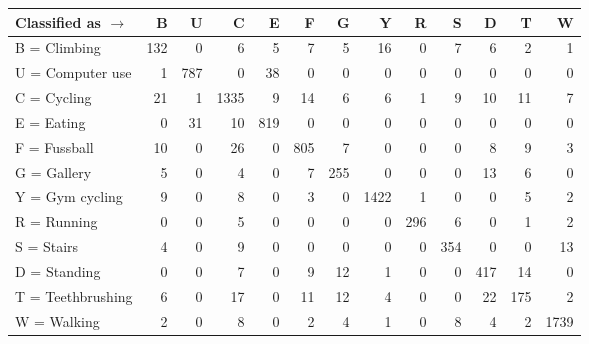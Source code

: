 \begin{tabular}{lrrrrrrrrrrrr}
\toprule
Classified as $\rightarrow$ &    B &    U &     C &    E &    F &    G &     Y &    R &    S &    D &    T &     W \\
\midrule
B = Climbing      &  132 &    0 &     6 &    5 &    7 &    5 &    16 &    0 &    7 &    6 &    2 &     1 \\
U = Computer use  &    1 &  787 &     0 &   38 &    0 &    0 &     0 &    0 &    0 &    0 &    0 &     0 \\
C = Cycling       &   21 &    1 &  1335 &    9 &   14 &    6 &     6 &    1 &    9 &   10 &   11 &     7 \\
E = Eating        &    0 &   31 &    10 &  819 &    0 &    0 &     0 &    0 &    0 &    0 &    0 &     0 \\
F = Fussball      &   10 &    0 &    26 &    0 &  805 &    7 &     0 &    0 &    0 &    8 &    9 &     3 \\
G = Gallery       &    5 &    0 &     4 &    0 &    7 &  255 &     0 &    0 &    0 &   13 &    6 &     0 \\
Y = Gym cycling   &    9 &    0 &     8 &    0 &    3 &    0 &  1422 &    1 &    0 &    0 &    5 &     2 \\
R = Running       &    0 &    0 &     5 &    0 &    0 &    0 &     0 &  296 &    6 &    0 &    1 &     2 \\
S = Stairs        &    4 &    0 &     9 &    0 &    0 &    0 &     0 &    0 &  354 &    0 &    0 &    13 \\
D = Standing      &    0 &    0 &     7 &    0 &    9 &   12 &     1 &    0 &    0 &  417 &   14 &     0 \\
T = Teethbrushing &    6 &    0 &    17 &    0 &   11 &   12 &     4 &    0 &    0 &   22 &  175 &     2 \\
W = Walking       &    2 &    0 &     8 &    0 &    2 &    4 &     1 &    0 &    8 &    4 &    2 &  1739 \\
\bottomrule
\end{tabular}
